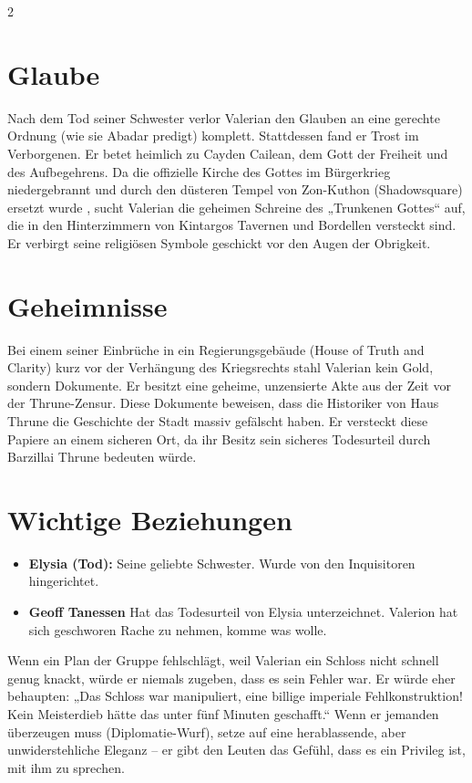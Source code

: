 \documentclass[10pt,a4paper]{article}
\begin{document}
\begin{multicols}{2}
\section{Glaube}
Nach dem Tod seiner Schwester verlor Valerian den Glauben an eine gerechte Ordnung (wie sie Abadar predigt) komplett. Stattdessen fand er Trost im Verborgenen. Er betet heimlich zu Cayden Cailean, dem Gott der Freiheit und des Aufbegehrens. Da die offizielle Kirche des Gottes im Bürgerkrieg niedergebrannt und durch den düsteren Tempel von Zon-Kuthon (Shadowsquare) ersetzt wurde , sucht Valerian die geheimen Schreine des „Trunkenen Gottes“ auf, die in den Hinterzimmern von Kintargos Tavernen und Bordellen versteckt sind. Er verbirgt seine religiösen Symbole geschickt vor den Augen der Obrigkeit.


\section{Geheimnisse}
Bei einem seiner Einbrüche in ein Regierungsgebäude (House of Truth and Clarity) kurz vor der Verhängung des Kriegsrechts stahl Valerian kein Gold, sondern Dokumente. Er besitzt eine geheime, unzensierte Akte aus der Zeit vor der Thrune-Zensur. Diese Dokumente beweisen, dass die Historiker von Haus Thrune die Geschichte der Stadt massiv gefälscht haben. Er versteckt diese Papiere an einem sicheren Ort, da ihr Besitz sein sicheres Todesurteil durch Barzillai Thrune bedeuten würde.

\section{Wichtige Beziehungen}
\begin{itemize}
    \item \textbf{Elysia (Tod):} Seine geliebte Schwester. Wurde von den Inquisitoren hingerichtet.
    \item \textbf{Geoff Tanessen} Hat das Todesurteil von Elysia unterzeichnet. Valerion hat sich geschworen Rache zu nehmen, komme was wolle.
\end{itemize}

\end{multicols}

\begin{tcolorbox}[title=Tipps vor der Kampagne, colframe=gray!60, colback=white, arc=1mm]
    \small
    Wenn ein Plan der Gruppe fehlschlägt, weil Valerian ein Schloss nicht schnell genug knackt, würde er niemals zugeben, dass es sein Fehler war. Er würde eher behaupten: „Das Schloss war manipuliert, eine billige imperiale Fehlkonstruktion! Kein Meisterdieb hätte das unter fünf Minuten geschafft.“ Wenn er jemanden überzeugen muss (Diplomatie-Wurf), setze auf eine herablassende, aber unwiderstehliche Eleganz – er gibt den Leuten das Gefühl, dass es ein Privileg ist, mit ihm zu sprechen.
\end{tcolorbox}
\end{document}
